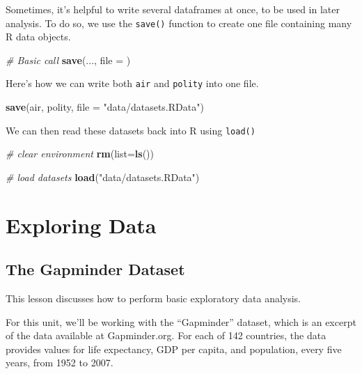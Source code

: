 \documentclass[]{book}
\newenvironment{Shaded}{\begin{snugshade}}{\end{snugshade}}
\newcommand{\KeywordTok}[1]{\textcolor[rgb]{0.13,0.29,0.53}{\textbf{#1}}}
\newcommand{\DataTypeTok}[1]{\textcolor[rgb]{0.13,0.29,0.53}{#1}}
\newcommand{\StringTok}[1]{\textcolor[rgb]{0.31,0.60,0.02}{#1}}
\newcommand{\CommentTok}[1]{\textcolor[rgb]{0.56,0.35,0.01}{\textit{#1}}}
\newcommand{\NormalTok}[1]{#1}
\begin{document}
Sometimes, it's helpful to write several dataframes at once, to be used
in later analysis. To do so, we use the \texttt{save()} function to
create one file containing many R data objects.

\begin{Shaded}
\begin{Highlighting}[]
\CommentTok{# Basic call}
\KeywordTok{save}\NormalTok{(..., }\DataTypeTok{file =}\NormalTok{ )}
\end{Highlighting}
\end{Shaded}

Here's how we can write both \texttt{air} and \texttt{polity} into one
file.

\begin{Shaded}
\begin{Highlighting}[]
\KeywordTok{save}\NormalTok{(air, polity, }\DataTypeTok{file =} \StringTok{"data/datasets.RData"}\NormalTok{)}
\end{Highlighting}
\end{Shaded}

We can then read these datasets back into R using \texttt{load()}

\begin{Shaded}
\begin{Highlighting}[]
\CommentTok{# clear environment}
\KeywordTok{rm}\NormalTok{(}\DataTypeTok{list=}\KeywordTok{ls}\NormalTok{())}

\CommentTok{# load datasets}
\KeywordTok{load}\NormalTok{(}\StringTok{"data/datasets.RData"}\NormalTok{)}
\end{Highlighting}
\end{Shaded}

\section{Exploring Data}\label{exploring-data}

\subsection{The Gapminder Dataset}\label{the-gapminder-dataset}

This lesson discusses how to perform basic exploratory data analysis.

For this unit, we'll be working with the ``Gapminder'' dataset, which is
an excerpt of the data available at Gapminder.org. For each of 142
countries, the data provides values for life expectancy, GDP per capita,
and population, every five years, from 1952 to 2007.
\end{document}
